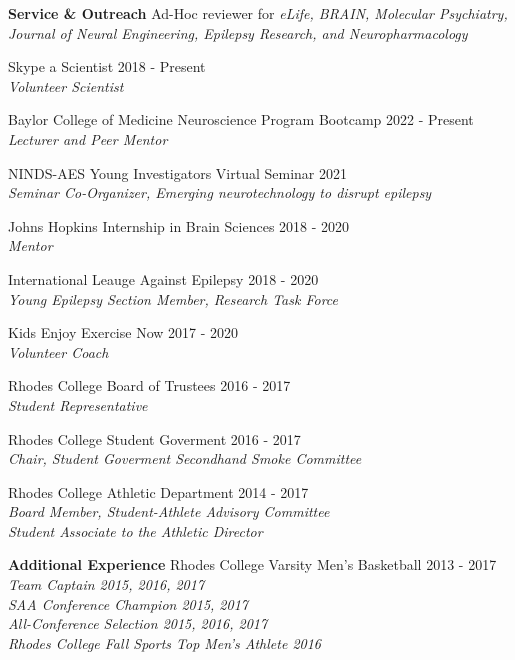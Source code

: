 \documentclass{resume} %
\begin{document}
\begin{rSection}{{\bfseries Service \& Outreach}}
Ad-Hoc reviewer for \emph{eLife, BRAIN, Molecular Psychiatry, Journal of Neural Engineering, Epilepsy Research, and Neuropharmacology}
\item Skype a Scientist  \hfill {2018 - Present}
\\ \emph{Volunteer Scientist}
\item Baylor College of Medicine Neuroscience Program Bootcamp \hfill {2022 - Present}
\\ \emph{Lecturer and Peer Mentor}
\item NINDS-AES Young Investigators Virtual Seminar \hfill {2021} 
\\ \emph{Seminar Co-Organizer, Emerging neurotechnology to disrupt epilepsy}
\item Johns Hopkins Internship in Brain Sciences \hfill{2018 - 2020}
\\ \emph{Mentor}
\item International Leauge Against Epilepsy \hfill {2018 - 2020}
\\ \emph{Young Epilepsy Section Member, Research Task Force}
\item Kids Enjoy Exercise Now  \hfill {2017 - 2020}
\\ \emph{Volunteer Coach}
\item Rhodes College Board of Trustees \hfill {2016 - 2017}
\\ \emph{Student Representative}
\item Rhodes College Student Goverment \hfill {2016 - 2017}
\\ \emph{Chair, Student Goverment Secondhand Smoke Committee}
\item Rhodes College Athletic Department \hfill {2014 - 2017}
\\ \emph{Board Member, Student-Athlete Advisory Committee}
\\ \emph{Student Associate to the Athletic Director}
\end{rSection}


\begin{rSection}{{\bfseries Additional Experience}}
Rhodes College Varsity Men’s Basketball  \hfill {2013 - 2017}
\\ \emph{Team Captain 2015, 2016, 2017}
\\ \emph{SAA Conference Champion 2015, 2017}
\\ \emph{All-Conference Selection 2015, 2016, 2017}
\\ \emph{Rhodes College Fall Sports Top Men’s Athlete 2016}

\end{rSection}
\end{document}
